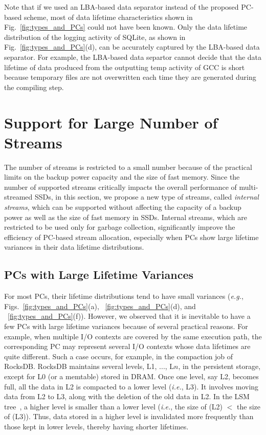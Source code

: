 Note that if we used an LBA-based data separator instead of the proposed
PC-based scheme, most of data lifetime characteristics shown in
Fig.~\ref{fig:types_and_PCs} could not have been known.  Only the data lifetime
distribution of the logging activity of SQLite, as shown in
Fig.~\ref{fig:types_and_PCs}(d), can be accurately captured by the LBA-based
data separator.  For example, the LBA-based data separtor cannot decide that
the data lifetime of data produced from the outputting temp activity of GCC is
short because temporary files are not overwritten each time they
are generated during the compiling step. 

\section{Support for Large Number of Streams}
\label{sec:internal}
The number of streams is restricted to a small number 
because of the practical limits on the backup power capacity and the size of fast memory.
Since the number of supported streams critically impacts the overall performance 
of multi-streamed SSDs, in this section, we propose a new type of streams, 
called {\it internal streams}, which can be
supported without affecting the capacity of a backup power as well as 
the size of fast memory in SSDs.   
Internal streams, which are restricted to be used only for garbage collection, 
significantly improve the efficiency of PC-based stream allocation,
especially when PCs show large lifetime variances in their data lifetime
distributions.

\subsection{PCs with Large Lifetime Variances}
\label{sec:largevariance}
For most PCs, their lifetime distributions tend to have small variances
({\it e.g.}, Figs.~\ref{fig:types_and_PCs}(a), ~\ref{fig:types_and_PCs}(d), and
~\ref{fig:types_and_PCs}(f)).
However, we observed that 
it is inevitable to have a few PCs with large lifetime variances 
because of several practical reasons.
For example, when multiple I/O contexts are covered by the same execution path, 
the corresponding PC may represent several I/O contexts whose data lifetimes are quite different.   
Such a case occurs, for example, 
in the compaction job of RocksDB.
RocksDB maintains
several levels, L1, ..., L$n$, in the persistent storage, except for L0 (or a
memtable) stored in DRAM.  Once one level, say L2, becomes full, all the data
in L2 is compacted to a lower level ({\it i.e.}, L3).  It involves moving data from L2
to L3, along with the deletion of the old data in L2.  In the
LSM tree~\cite{LSM}, a higher level is smaller than a lower level 
({\it i.e.}, the size of (L2) $<$ the size of (L3)). 
Thus, data stored in a higher level is invalidated more frequently than those kept
in lower levels, thereby having shorter lifetimes.

